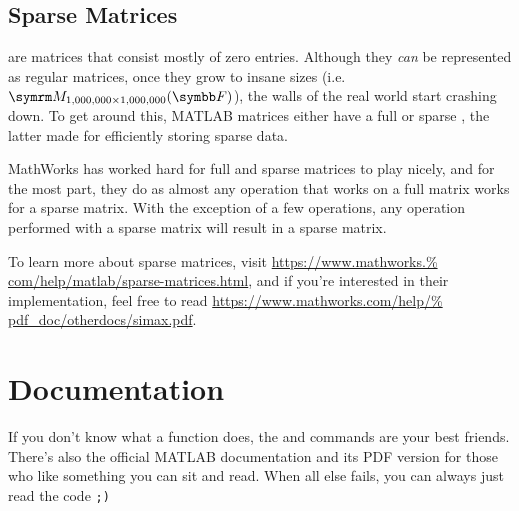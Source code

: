 \documentclass{article}
\begin{document}
\subsection{Sparse Matrices}

 are matrices that consist mostly of zero entries.  Although
they \emph{can} be represented as regular matrices, once they grow to
insane sizes (i.e.~\(\matrixField{1,000,000}{1,000,000}{F}\)), the walls
of the real world start crashing down.  To get around this, MATLAB
matrices either have a full or sparse , the latter
made for efficiently storing sparse data.

MathWorks has worked hard for full and sparse matrices to play nicely,
and for the most part, they do as almost any operation that works on a
full matrix works for a sparse matrix.  With the exception of a few
operations, any operation performed with a sparse matrix will result in
a sparse matrix.

To learn more about sparse matrices, visit \url{https://www.mathworks.%
com/help/matlab/sparse-matrices.html}, and if you're interested in their
implementation, feel free to read \url{https://www.mathworks.com/help/%
pdf_doc/otherdocs/simax.pdf}.

\section{Documentation}

If you don't know what a function does, the  and  commands are your best
friends.  There's also the official MATLAB documentation and its PDF version for those who like something
you can sit and read.  When all else fails, you can always just read the
code \texttt{;)}
\end{document}
